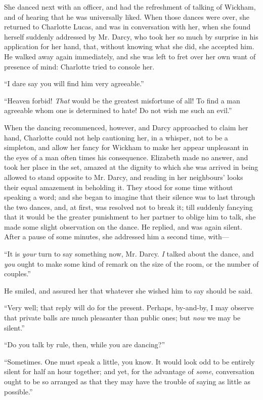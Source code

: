 \documentclass[12pt]{book}
\begin{document}
She danced next with an officer, and had the refreshment of talking of Wickham, and of hearing that he was universally liked. When those dances were over, she returned to Charlotte Lucas, and was in conversation with her, when she found herself suddenly addressed by Mr. Darcy, who took her so much by surprise in his application for her hand, that, without knowing what she did, she accepted him. He walked away again immediately, and she was left to fret over her own want of presence of mind: Charlotte tried to console her.

``I dare say you will find him very agreeable.''

``Heaven forbid! \textit{That} would be the greatest misfortune of all! To find a man agreeable whom one is determined to hate! Do not wish me such an evil.''

When the dancing recommenced, however, and Darcy approached to claim her hand, Charlotte could not help cautioning her, in a whisper, not to be a simpleton, and allow her fancy for Wickham to make her appear unpleasant in the eyes of a man often times his consequence. Elizabeth made no answer, and took her place in the set, amazed at the dignity to which she was arrived in being allowed to stand opposite to Mr. Darcy, and reading in her neighbours' looks their equal amazement in beholding it. They stood for some time without speaking a word; and she began to imagine that their silence was to last through the two dances, and, at first, was resolved not to break it; till suddenly fancying that it would be the greater punishment to her partner to oblige him to talk, she made some slight observation on the dance. He replied, and was again silent. After a pause of some minutes, she addressed him a second time, with---

``It is \textit{your} turn to say something now, Mr. Darcy. \textit{I} talked about the dance, and \textit{you} ought to make some kind of remark on the size of the room, or the number of couples.''

He smiled, and assured her that whatever she wished him to say should be said.

``Very well; that reply will do for the present. Perhaps, by-and-by, I may observe that private balls are much pleasanter than public ones; but \textit{now} we may be silent.''

``Do you talk by rule, then, while you are dancing?''

``Sometimes. One must speak a little, you know. It would look odd to be entirely silent for half an hour together; and yet, for the advantage of \textit{some}, conversation ought to be so arranged as that they may have the trouble of saying as little as possible.''
\end{document}
